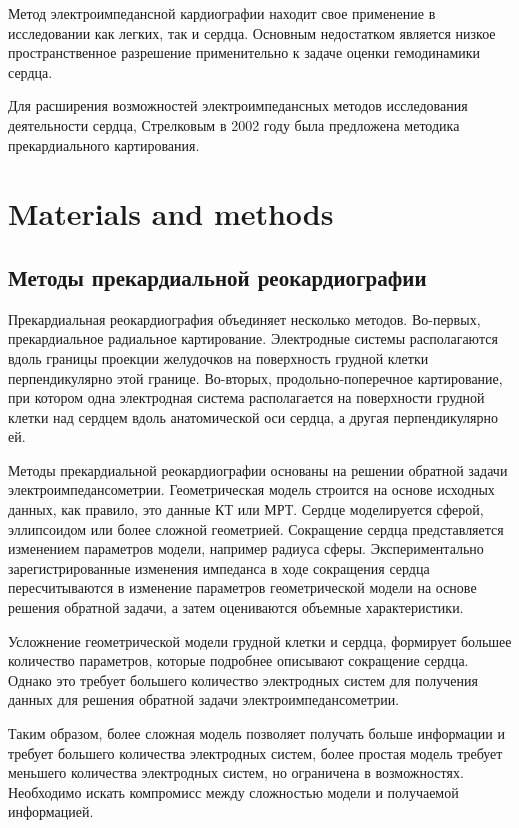 \documentclass[conference]{IEEEtran}
\begin{document}
Метод электроимпедансной кардиографии находит свое применение в исследовании как легких, так и сердца.
Основным недостатком является низкое пространственное разрешение применительно к задаче оценки гемодинамики сердца.

Для расширения возможностей электроимпедансных методов исследования деятельности сердца, Стрелковым в 2002 году была предложена методика прекардиального картирования.

\section{Materials and methods}

\subsection{Методы прекардиальной реокардиографии}

Прекардиальная реокардиография объединяет несколько методов.
Во-первых, прекардиальное радиальное картирование.
Электродные системы располагаются вдоль границы проекции желудочков на поверхность грудной клетки перпендикулярно этой границе.
Во-вторых, продольно-поперечное картирование, при котором одна электродная система располагается на поверхности грудной клетки над сердцем вдоль анатомической оси сердца, а другая перпендикулярно ей.

Методы прекардиальной реокардиографии основаны на решении обратной задачи электроимпедансометрии.
Геометрическая модель строится на основе исходных данных, как правило, это данные КТ или МРТ.
Сердце моделируется сферой, эллипсоидом или более сложной геометрией.
Сокращение сердца представляется изменением параметров модели, например радиуса сферы.
Экспериментально зарегистрированные изменения импеданса в ходе сокращения сердца пересчитываются в изменение параметров геометрической модели на основе решения обратной задачи, а затем оцениваются объемные характеристики.

Усложнение геометрической модели грудной клетки и сердца, формирует большее количество параметров, которые подробнее описывают сокращение сердца.
Однако это требует большего количество электродных систем для получения данных для решения обратной задачи электроимпедансометрии.

Таким образом, более сложная модель позволяет получать больше информации и требует большего количества электродных систем, более простая модель требует меньшего количества электродных систем, но ограничена в возможностях.
Необходимо искать компромисс между сложностью модели и получаемой информацией.
\end{document}
